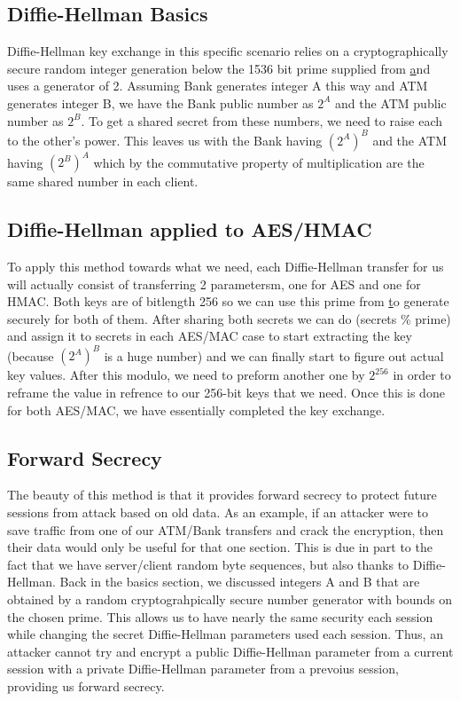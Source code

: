 			\subsection{Diffie-Hellman Basics}\label{sec:dhexbasic}
				Diffie-Hellman key exchange in this specific scenario relies on a cryptographically secure random integer generation below the 1536 bit prime supplied from \href{https://www.ietf.org/rfc/rfc3526.txt} and uses a generator of 2. Assuming Bank generates integer A this way and ATM generates integer B, we have the Bank public number as $2^A$ and the ATM public number as $2^B$. To get a shared secret from these numbers, we need to raise each to the other's power. This leaves us with the Bank having $(2^A)^B$ and the ATM having $(2^B)^A$ which by the commutative property of multiplication are the same shared number in each client.
			
			\subsection{Diffie-Hellman applied to AES/HMAC}\label{sec:dhexahm}
				To apply this method towards what we need, each Diffie-Hellman transfer for us will actually consist of transferring 2 parametersm, one for AES and one for HMAC. Both keys are of bitlength 256 so we can use this prime from \href{https://www.ietf.org/rfc/rfc3526.txt} to generate securely for both of them. After sharing both secrets we can do (secrets \% prime) and assign it to secrets in each AES/MAC case to start extracting the key (because $(2^A)^B$ is a huge number) and we can finally start to figure out actual key values. After this modulo, we need to preform another one by $2^256$ in order to reframe the value in refrence to our 256-bit keys that we need. Once this is done for both AES/MAC, we have essentially completed the key exchange.
				
			\subsection{Forward Secrecy}\label{sec:dhexfwd}
				The beauty of this method is that it provides forward secrecy to protect future sessions from attack based on old data. As an example, if an attacker were to save traffic from one of our ATM/Bank transfers and crack the encryption, then their data would only be useful for that one section. This is due in part to the fact that we have server/client random byte sequences, but also thanks to Diffie-Hellman. Back in the basics section, we discussed integers A and B that are obtained by a random cryptograhpically secure number generator with bounds on the chosen prime. This allows us to have nearly the same security each session while changing the secret Diffie-Hellman parameters used each session. Thus, an attacker cannot try and encrypt a public Diffie-Hellman parameter from a current session with a private Diffie-Hellman parameter from a prevoius session, providing us forward secrecy.
		
